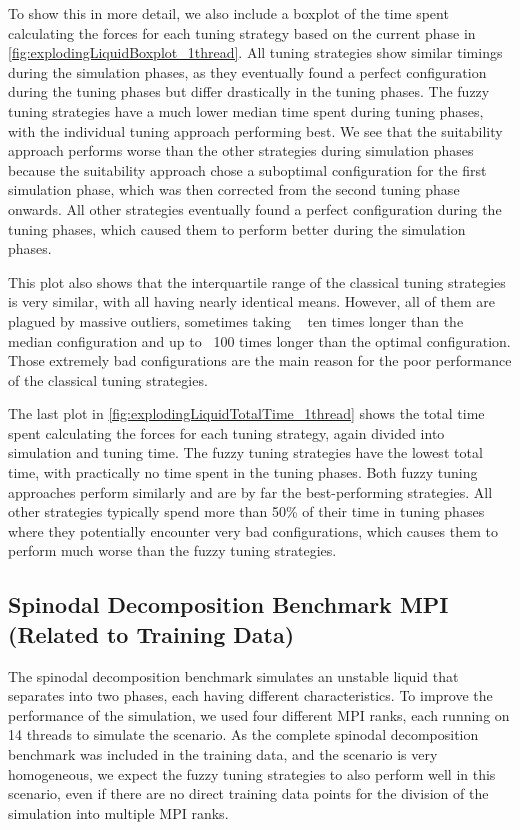 To show this in more detail, we also include a boxplot of the time spent calculating the forces for each tuning strategy based on the current phase in \autoref{fig:explodingLiquidBoxplot_1thread}. All tuning strategies show similar timings during the simulation phases, as they eventually found a perfect configuration during the tuning phases but differ drastically in the tuning phases. The fuzzy tuning strategies have a much lower median time spent during tuning phases, with the individual tuning approach performing best. We see that the suitability approach performs worse than the other strategies during simulation phases because the suitability approach chose a suboptimal configuration for the first simulation phase, which was then corrected from the second tuning phase onwards. All other strategies eventually found a perfect configuration during the tuning phases, which caused them to perform better during the simulation phases.

This plot also shows that the interquartile range of the classical tuning strategies is very similar, with all having nearly identical means. However, all of them are plagued by massive outliers, sometimes taking ~ ten times longer than the median configuration and up to ~100 times longer than the optimal configuration. Those extremely bad configurations are the main reason for the poor performance of the classical tuning strategies.

The last plot in \autoref{fig:explodingLiquidTotalTime_1thread} shows the total time spent calculating the forces for each tuning strategy, again divided into simulation and tuning time. The fuzzy tuning strategies have the lowest total time, with practically no time spent in the tuning phases. Both fuzzy tuning approaches perform similarly and are by far the best-performing strategies. All other strategies typically spend more than 50\% of their time in tuning phases where they potentially encounter very bad configurations, which causes them to perform much worse than the fuzzy tuning strategies.


\subsection{Spinodal Decomposition Benchmark MPI (Related to Training Data)}

The spinodal decomposition benchmark simulates an unstable liquid that separates into two phases, each having different characteristics. To improve the performance of the simulation, we used four different MPI ranks, each running on 14 threads to simulate the scenario. As the complete spinodal decomposition benchmark was included in the training data, and the scenario is very homogeneous, we expect the fuzzy tuning strategies to also perform well in this scenario, even if there are no direct training data points for the division of the simulation into multiple MPI ranks.

